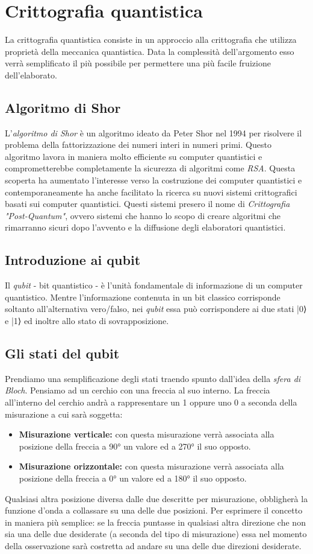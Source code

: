 \documentclass[a4paper, 12pt]{article}
\begin{document}
\section{Crittografia quantistica}
La crittografia quantistica consiste in un approccio alla crittografia che utilizza proprietà della meccanica quantistica. Data la complessità dell'argomento esso verrà semplificato il più possibile per permettere una più facile fruizione dell'elaborato.
\subsection{Algoritmo di Shor}
L'\textit{algoritmo di Shor} è un algoritmo ideato da Peter Shor nel 1994 per risolvere il problema della fattorizzazione dei numeri interi in numeri primi.
Questo algoritmo lavora in maniera molto efficiente su computer quantistici e comprometterebbe completamente la sicurezza di algoritmi come \textit{RSA}. Questa scoperta ha aumentato l'interesse verso la costruzione dei computer quantistici e contemporaneamente ha anche facilitato la ricerca su nuovi sistemi crittografici basati sui computer quantistici. Questi sistemi presero il nome di \textit{Crittografia "Post-Quantum"}, ovvero sistemi che hanno lo scopo di creare algoritmi che rimarranno sicuri dopo l'avvento e la diffusione degli elaboratori quantistici. 
\subsection{Introduzione ai qubit}
Il \textit{qubit} - bit quantistico - è l'unità fondamentale di informazione di un computer quantistico.
Mentre l'informazione contenuta in un bit classico corrisponde soltanto all'alternativa vero/falso, nei \textit{qubit} essa può corrispondere ai due stati |0⟩ e |1⟩ ed inoltre allo stato di sovrapposizione.
\subsection{Gli stati del qubit}
Prendiamo una semplificazione degli stati traendo spunto dall'idea della \textit{sfera di Bloch}. Pensiamo ad un cerchio con una freccia al suo interno. La freccia all'interno del cerchio andrà a rappresentare un 1 oppure uno 0 a seconda della misurazione a cui sarà soggetta:
\begin{itemize}
	\item \textbf{Misurazione verticale:} con questa misurazione verrà associata alla posizione della freccia a 90° un valore ed a 270° il suo opposto.
	\item \textbf{Misurazione orizzontale:} con questa misurazione verrà associata alla posizione della freccia a 0° un valore ed a 180° il suo opposto.
\end{itemize} 
Qualsiasi altra posizione diversa dalle due descritte per misurazione, obbligherà la funzione d'onda a collassare su una delle due posizioni. Per esprimere il concetto in maniera più semplice: se la freccia puntasse in qualsiasi altra direzione che non sia una delle due desiderate (a seconda del tipo di misurazione) essa nel momento della osservazione sarà costretta ad andare su una delle due direzioni desiderate.
\end{document}
